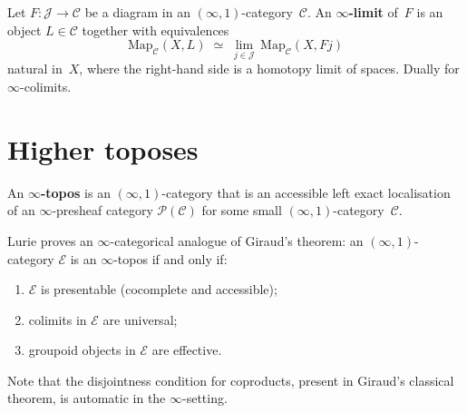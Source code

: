 \begin{definition}\label{def:infty-limit}
Let $F\colon\mathcal{J}\to\mathcal{C}$ be a diagram in an
$(\infty,1)$-category~$\mathcal{C}$.  An \textbf{$\infty$-limit}
of~$F$ is an object $L\in\mathcal{C}$ together with equivalences
\[
    \mathrm{Map}_\mathcal{C}(X, L)
    \;\simeq\;
    \lim_{j\in\mathcal{J}}\, \mathrm{Map}_\mathcal{C}(X, Fj)
\]
natural in~$X$, where the right-hand side is a homotopy limit of spaces.
Dually for $\infty$-colimits.
\end{definition}



\section{Higher toposes}\label{sec:higher-toposes}


\begin{definition}\label{def:infty-topos}
An \textbf{$\infty$-topos} is an $(\infty,1)$-category that is an
accessible left exact localisation of an $\infty$-presheaf category
$\mathcal{P}(\mathcal{C})$ for some small $(\infty,1)$-category~$\mathcal{C}$.
\end{definition}

\begin{remark}\label{rem:infty-topos-giraud}
Lurie proves an $\infty$-categorical analogue of Giraud's theorem:
an $(\infty,1)$-category $\mathcal{E}$ is an $\infty$-topos if and only if:
\begin{enumerate}[label=(\roman*)]
\item $\mathcal{E}$ is presentable (cocomplete and accessible);
\item colimits in $\mathcal{E}$ are universal;
\item groupoid objects in $\mathcal{E}$ are effective.
\end{enumerate}
Note that the disjointness condition for coproducts, present in Giraud's
classical theorem, is automatic in the $\infty$-setting.
\end{remark}

